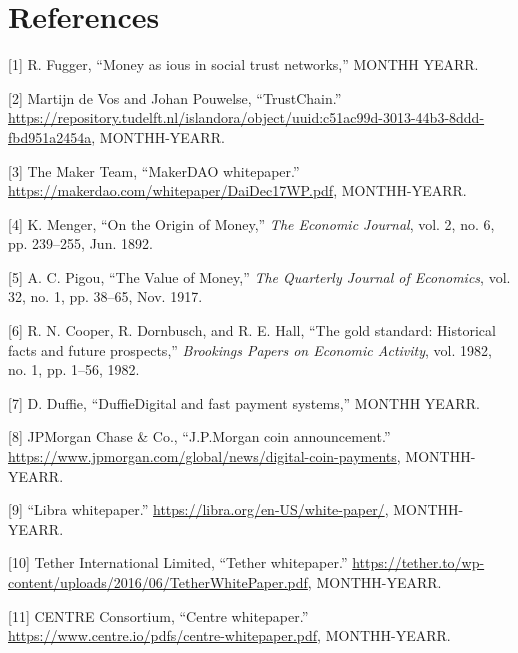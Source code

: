 \documentclass[english,]{IEEEtran}
\begin{document}
\section*{References}\label{references}

\hypertarget{refs}{}
\hypertarget{ref-Money_as_IOUs_in_Social_Trust_Networks}{}
{[}1{]} R. Fugger, ``Money as ious in social trust networks,'' MONTHH
YEARR.

\hypertarget{ref-TrustChain}{}
{[}2{]} Martijn de Vos and Johan Pouwelse, ``TrustChain.''
\url{https://repository.tudelft.nl/islandora/object/uuid:c51ac99d-3013-44b3-8ddd-fbd951a2454a},
MONTHH-YEARR.

\hypertarget{ref-MakerDAO:whitepaper}{}
{[}3{]} The Maker Team, ``MakerDAO whitepaper.''
\url{https://makerdao.com/whitepaper/DaiDec17WP.pdf}, MONTHH-YEARR.

\hypertarget{ref-On_the_Origin_of_Money}{}
{[}4{]} K. Menger, ``On the Origin of Money,'' \emph{The Economic
Journal}, vol. 2, no. 6, pp. 239--255, Jun. 1892.

\hypertarget{ref-Value_of_Money}{}
{[}5{]} A. C. Pigou, ``The Value of Money,'' \emph{The Quarterly Journal
of Economics}, vol. 32, no. 1, pp. 38--65, Nov. 1917.

\hypertarget{ref-The_Gold_Standard}{}
{[}6{]} R. N. Cooper, R. Dornbusch, and R. E. Hall, ``The gold standard:
Historical facts and future prospects,'' \emph{Brookings Papers on
Economic Activity}, vol. 1982, no. 1, pp. 1--56, 1982.

\hypertarget{ref-DuffieDigital_and_Fast_Payment_Systems}{}
{[}7{]} D. Duffie, ``DuffieDigital and fast payment systems,'' MONTHH
YEARR.

\hypertarget{ref-JPMorgan_Coin:whitepaper}{}
{[}8{]} JPMorgan Chase \& Co., ``J.P.Morgan coin announcement.''
\url{https://www.jpmorgan.com/global/news/digital-coin-payments},
MONTHH-YEARR.

\hypertarget{ref-Libra:whitepaper}{}
{[}9{]} ``Libra whitepaper.''
\url{https://libra.org/en-US/white-paper/}, MONTHH-YEARR.

\hypertarget{ref-Tether:whitepaper}{}
{[}10{]} Tether International Limited, ``Tether whitepaper.''
\url{https://tether.to/wp-content/uploads/2016/06/TetherWhitePaper.pdf},
MONTHH-YEARR.

\hypertarget{ref-Centre:whitepaper}{}
{[}11{]} CENTRE Consortium, ``Centre whitepaper.''
\url{https://www.centre.io/pdfs/centre-whitepaper.pdf}, MONTHH-YEARR.
\end{document}
